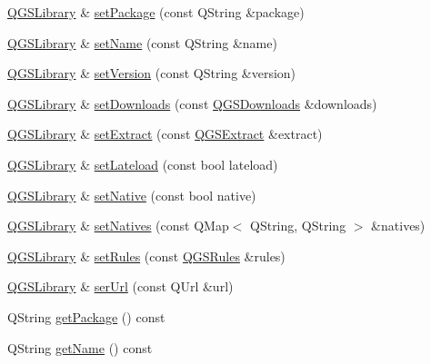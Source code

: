 \begin{DoxyCompactItemize}
\item 
\mbox{\hyperlink{class_q_g_s_library}{Q\+G\+S\+Library}} \& \mbox{\hyperlink{class_q_g_s_library_a6cf4ab11fc5ba67f922029bf64dc913d}{set\+Package}} (const Q\+String \&package)
\item 
\mbox{\hyperlink{class_q_g_s_library}{Q\+G\+S\+Library}} \& \mbox{\hyperlink{class_q_g_s_library_aa3824af4d8d7e8cad72b2ca6090d8793}{set\+Name}} (const Q\+String \&name)
\item 
\mbox{\hyperlink{class_q_g_s_library}{Q\+G\+S\+Library}} \& \mbox{\hyperlink{class_q_g_s_library_ad9d5ea32b24e5e38d3ad4a16f472ce9c}{set\+Version}} (const Q\+String \&version)
\item 
\mbox{\hyperlink{class_q_g_s_library}{Q\+G\+S\+Library}} \& \mbox{\hyperlink{class_q_g_s_library_a530510fc01c2e9e7ddcfb70776938f94}{set\+Downloads}} (const \mbox{\hyperlink{class_q_g_s_downloads}{Q\+G\+S\+Downloads}} \&downloads)
\item 
\mbox{\hyperlink{class_q_g_s_library}{Q\+G\+S\+Library}} \& \mbox{\hyperlink{class_q_g_s_library_a26581d7337d9ec2d81e6ed3c5845397d}{set\+Extract}} (const \mbox{\hyperlink{class_q_g_s_extract}{Q\+G\+S\+Extract}} \&extract)
\item 
\mbox{\hyperlink{class_q_g_s_library}{Q\+G\+S\+Library}} \& \mbox{\hyperlink{class_q_g_s_library_a2c20de456550c52fac22f5274087f7f3}{set\+Lateload}} (const bool lateload)
\item 
\mbox{\hyperlink{class_q_g_s_library}{Q\+G\+S\+Library}} \& \mbox{\hyperlink{class_q_g_s_library_a94336f2ac4a8da09d3f40aa206f4df77}{set\+Native}} (const bool native)
\item 
\mbox{\hyperlink{class_q_g_s_library}{Q\+G\+S\+Library}} \& \mbox{\hyperlink{class_q_g_s_library_a234dc14b0a2e02f04e39295ba80e8bd7}{set\+Natives}} (const Q\+Map$<$ Q\+String, Q\+String $>$ \&natives)
\item 
\mbox{\hyperlink{class_q_g_s_library}{Q\+G\+S\+Library}} \& \mbox{\hyperlink{class_q_g_s_library_ac22dd383fc3706b061fd08f9606292fa}{set\+Rules}} (const \mbox{\hyperlink{class_q_g_s_rules}{Q\+G\+S\+Rules}} \&rules)
\item 
\mbox{\hyperlink{class_q_g_s_library}{Q\+G\+S\+Library}} \& \mbox{\hyperlink{class_q_g_s_library_a28d9c7df68ef5e305c737785de4e3fc6}{ser\+Url}} (const Q\+Url \&url)
\item 
Q\+String \mbox{\hyperlink{class_q_g_s_library_ae590d32db993c4491743d72039e2559c}{get\+Package}} () const
\item 
Q\+String \mbox{\hyperlink{class_q_g_s_library_a1f9e58998797bd8d556fa5ab6c9492f7}{get\+Name}} () const

\end{DoxyCompactItemize}
